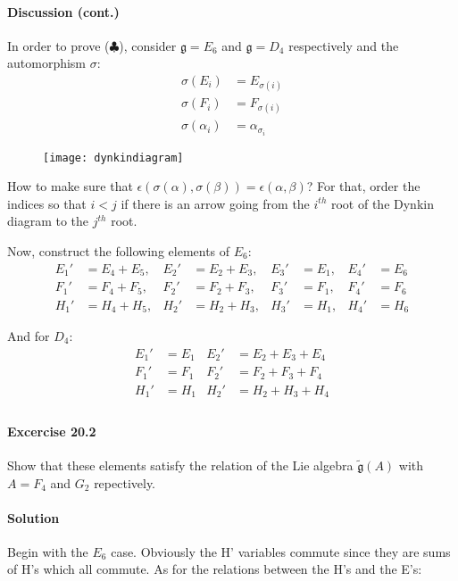 \documentclass[11pt]{article}
\newcommand{\g}{\ensuremath{\mathfrak{g}}}
\begin{document}
\paragraph{Discussion (cont.)}
In order to prove ($\clubsuit$), consider $\g=E_6$ and $\g=D_4$ respectively
and the automorphism $\sigma$:
\begin{align*}
\sigma(E_i)&=E_{\sigma(i)} \\
\sigma(F_i)&=F_{\sigma(i)} \\
\sigma(\alpha_i) &= \alpha_{\sigma_i}
\end{align*}

\begin{figure} \label{fig1}
\begin{center}
\texttt{[image: dynkindiagram]}
\end{center}
\end{figure}

How to make sure that $\epsilon(\sigma(\alpha),\sigma(\beta)) = \epsilon(
\alpha,\beta)$? For that, order the indices so that $i<j$ if there is
an arrow going from the $i^{th}$ root of the Dynkin diagram to the $j^{th}$
root.

Now, construct the following elements of $E_6$:
\begin{align*}
E_1' &= E_4+E_5, & E_2' &= E_2+E_3, & E_3'&=E_1, & E_4'&=E_6 \\
F_1' &= F_4+F_5, & F_2' &= F_2+F_3, & F_3'&=F_1, & F_4'&=F_6 \\
H_1' &= H_4+H_5, & H_2' &= H_2+H_3, & H_3'&=H_1, & H_4'&=H_6
\end{align*}

And for $D_4$:
\begin{align*}
E_1' &= E_1 & E_2' &= E_2+E_3+E_4 \\
F_1' &= F_1 & F_2' &= F_2+F_3+F_4 \\
H_1' &= H_1 & H_2' &= H_2+H_3+H_4 \\
\end{align*}

\paragraph{Excercise 20.2}
Show that these elements satisfy the relation of the Lie algebra $\tilde{\g}
(A)$ with $A=F_4$ and $G_2$ repectively.

\paragraph{Solution}
Begin with the $E_6$ case.  Obviously the H' variables commute since they are sums of H's which all commute. As for the relations between the H's and the E's:
\end{document}
